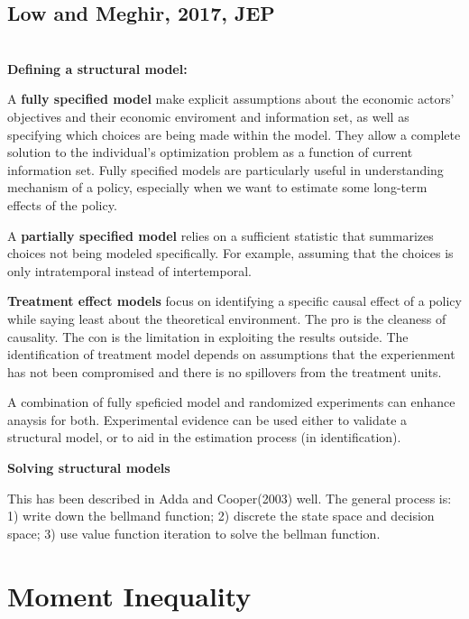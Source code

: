 \documentclass{book}
\theoremstyle{plain}
\theoremstyle{definition}
\begin{document}
\section{Low and Meghir, 2017, JEP} %
\label{sec:low_and_meghir_jep_2017}

\textbf{}\\

\textbf{Defining a structural model:}

A \textbf{fully specified model} make explicit assumptions about the economic actors' objectives and their economic enviroment and information set, as well as specifying which choices are being made within the model. They allow a complete solution to the individual's optimization problem as a function of current information set.
Fully specified models are particularly useful in understanding mechanism of a policy, especially when we want to estimate some long-term effects of the policy.

A \textbf{partially specified model} relies on a sufficient statistic that summarizes choices not being modeled specifically. For example, assuming that the choices is only intratemporal instead of intertemporal.

\textbf{Treatment effect models} focus on identifying a specific causal effect of a policy while saying least about the theoretical environment. The pro is the cleaness of causality. The con is the limitation in exploiting the results outside. The identification of treatment model depends on assumptions that the experienment has not been compromised and there is no spillovers from the treatment units.

A combination of fully speficied model and randomized experiments can enhance anaysis for both. Experimental evidence can be used either to validate a structural model, or to aid in the estimation process (in identification).

\textbf{Solving structural models}

This has been described in Adda and Cooper(2003) well. 
The general process is: 
1) write down the bellmand function;
2) discrete the state space and decision space;
3) use value function iteration to solve the bellman function.




\chapter{Moment Inequality} %
\label{cha:moment_inequality}
\end{document}
